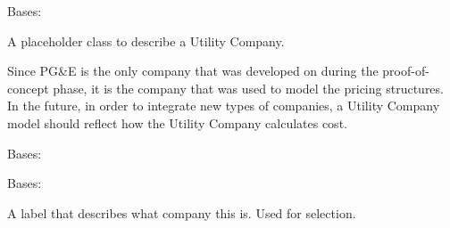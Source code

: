 \documentclass[letterpaper,10pt,english]{sphinxmanual}
\begin{document}
\begin{fulllineitems}
\label{modules/webapp:webapp.models.UtilityCompany}
Bases: 

A placeholder class to describe a Utility Company.

Since PG\&E is the only company that was developed on during the proof-of-concept phase,
it is the company that was used to model the pricing structures. In the future, in order
to integrate new types of companies, a Utility Company model should reflect how the Utility
Company calculates cost.

\begin{fulllineitems}
\label{modules/webapp:webapp.models.UtilityCompany.DoesNotExist}
Bases: 

\end{fulllineitems}


\begin{fulllineitems}
\label{modules/webapp:webapp.models.UtilityCompany.MultipleObjectsReturned}
Bases: 

\end{fulllineitems}


\begin{fulllineitems}
\label{modules/webapp:webapp.models.UtilityCompany.description}
A label that describes what company this is. Used for selection.

\end{fulllineitems}


\begin{fulllineitems}
\label{modules/webapp:webapp.models.UtilityCompany.devicewebsettings_set}
\end{fulllineitems}


\end{fulllineitems}
\end{document}
